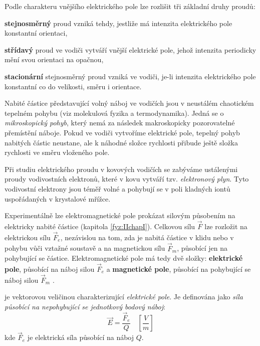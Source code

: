         Podle charakteru vnějšího elektrického pole lze rozlišit tři základní druhy proudů:
          \begin{description}[noitemsep]
            \item\textbf{stejnosměrný} proud vzniká tehdy, jestliže má intenzita elektrického pole
                   konstantní orientaci,
            \item\textbf{střídavý} proud ve vodiči vytváří vnější elektrické pole, jehož intenzita
                  periodicky mění svou orientaci na opačnou,
            \item\textbf{stacionární} stejnosměrný proud vzniká ve vodiči, je-li intenzita
                  elektrického pole konstantní co do velikosti, směru i orientace.
          \end{description}  

       Nabité částice představující volný náboj ve vodičích jsou v neustálém chaotickém tepelném
       pohybu (viz molekulová fyzika a termodynamika). Jedná se o \emph{mikroskopický pohyb}, který
       nemá za následek makroskopicky pozorovatelné přemístění náboje. Pokud ve vodiči vytvoříme
       elektrické pole, tepelný pohyb nabitých částic neustane, ale k náhodné složce rychlosti
       přibude ještě složka rychlosti ve směru vloženého pole.
       
       Při studiu elektrického proudu v kovových vodičích se zabýváme ustálenými proudy
       vodivostních elektronů, které v kovu vytváří tzv. \emph{elektronový plyn}. Tyto vodivostní
       elektrony jsou téměř volné a pohybují se v poli kladných iontů uspořádaných v krystalové
       mřížce.
        
       Experimentálně lze elektromagnetické pole prokázat silovým působením na elektricky nabité
       částice (kapitola \ref{fyz:IIchapI}). Celkovou sílu $\vec{F}$ lze rozložit na elektrickou 
       sílu $\vec{F}_e$, nezávislou na tom, zda je nabitá částice v klidu nebo v pohybu vůči 
       vztažné soustavě a na magnetickou sílu $\vec{F}_m$, působící jen na pohybující se částice. 
       Elektromagnetické pole má tedy dvě složky: \textbf{elektrické pole}, působící na náboj silou 
       $\vec{F}_e$ a \textbf{magnetické pole}, působící na pohybující se náboj silou $\vec{F}_m$  
       \cite[s.~13]{Mayer2001}. 
      
      \vspace{1em}
       je vektorovou veličinou charakterizující
        \emph{elektrické pole}.
        Je definována jako 
        \emph{síla působící na nepohybující se jednotkový bodový náboj}:
        \begin{equation}\label{TEMP:eq_E}
          \vec{E} = \frac{\vec{F}_e}{Q} \quad\left[\frac{V}{m}\right]  
        \end{equation}        
        kde $\vec{F}_e$ je elektrická síla působící na náboj $Q$.
      
